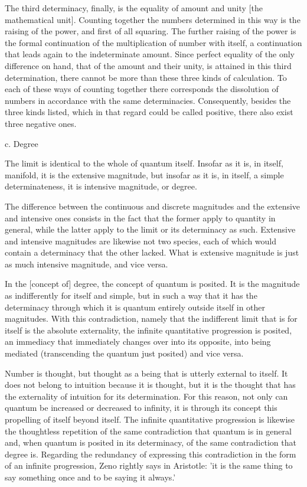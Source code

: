 The third determinacy, finally, is
the equality of amount and unity [the mathematical unit].
Counting together the numbers determined in this way is
the raising of the power, and first of all squaring.
The further raising of the power is the formal
continuation of the multiplication of number with itself,
a continuation that leads again to the indeterminate amount.
Since perfect equality of the only difference on hand,
that of the amount and their unity, is attained in
this third determination, there cannot be more than
these three kinds of calculation.
To each of these ways of counting together there corresponds
the dissolution of numbers in accordance with the same determinacies.
Consequently, besides the three kinds listed,
which in that regard could be called positive,
there also exist three negative ones.

c. Degree

The limit is identical to the whole of quantum itself.
Insofar as it is, in itself, manifold,
it is the extensive magnitude,
but insofar as it is, in itself,
a simple determinateness,
it is intensive magnitude,
or degree.

The difference between the continuous and discrete magnitudes
and the extensive and intensive ones consists in the fact
that the former apply to quantity in general,
while the latter apply to the limit or its determinacy as such.
Extensive and intensive magnitudes are likewise not two species,
each of which would contain a determinacy that the other lacked.
What is extensive magnitude is just as much
intensive magnitude, and vice versa.

In the [concept of] degree, the concept of quantum is posited.
It is the magnitude as indifferently for itself and simple,
but in such a way that it has the determinacy through which
it is quantum entirely outside itself in other magnitudes.
With this contradiction, namely that the indifferent limit
that is for itself is the absolute externality,
the infinite quantitative progression is posited,
an immediacy that immediately changes over into its opposite,
into being mediated (transcending the quantum just posited)
and vice versa.

Number is thought, but thought as a being
that is utterly external to itself.
It does not belong to intuition because it is thought,
but it is the thought that has the externality of intuition
for its determination.
For this reason, not only can quantum be
increased or decreased to infinity,
it is through its concept this
propelling of itself beyond itself.
The infinite quantitative progression is
likewise the thoughtless repetition
of the same contradiction
that quantum is in general
and, when quantum is posited in its determinacy,
of the same contradiction that degree is.
Regarding the redundancy of expressing
this contradiction in the form
of an infinite progression,
Zeno rightly says in Aristotle:
'it is the same thing to say something once
and to be saying it always.'

